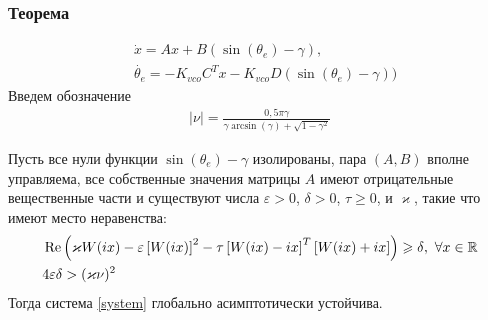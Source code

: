\documentclass{beamer}
\begin{document}
\begin{frame}
\frametitle{Теорема}
\vspace{-4mm}
 \begin{equation}
 \begin{aligned}
 &\dot{x} = Ax + B(\operatorname{sin}(\theta_e) - \gamma) \text{,}\\
 &\dot{\theta_e} = -K_{vco}C^T x -K_{vco}D(\operatorname{sin}(\theta_e) - \gamma))
 \end{aligned}
\end{equation}
\vspace{-2.5mm}
Введем обозначение
 \begin{equation}
 \begin{aligned}
\mid\nu\mid = \frac{0,5\pi\gamma}{\gamma \operatorname{arcsin} (\gamma) + \sqrt{1-\gamma^2}}
 \end{aligned}
\end{equation}
\vspace{-3mm}
\begin{theorem}[Леонов~Г.\:А.]
Пусть все нули функции $\operatorname{sin}(\theta_e) - \gamma$ изолированы, пара $(A, B)$ вполне управляема, все собственные значения матрицы $A$ имеют отрицательные вещественные части и существуют числа $\varepsilon > 0$, $\delta > 0$, $\tau \geqslant 0$, и $\varkappa$, такие что имеют место неравенства:\vspace{-2.5mm}
 \begin{align*}
&\operatorname{Re}\left( \varkappa W(ix)- \varepsilon\left[W(ix)\right]^2-\tau\left[ W(ix)-ix \right]^T\left[W(ix)+ix \right]\right) \geqslant \delta \text{,}\enskip\forall x \in \mathbb{R}\label{first_th_eq}\\
&4\varepsilon\delta > (\varkappa\nu)^2
\end{align*}
Тогда система \eqref{system} глобально асимптотически устойчива.
\end{theorem}
\end{frame}

\end{document}
